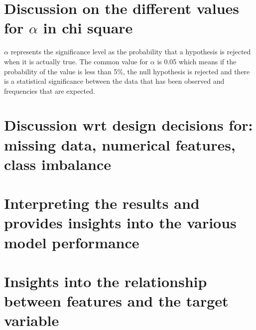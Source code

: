 \documentclass{article}
\begin{document}
\section{Discussion on the different values for $\alpha$ in chi square}

$\alpha$ represents the significance level as the probability that a hypothesis is rejected when it is actually true. The common value for $\alpha$ is 0.05 which means if the probability of the value is less than 5\%, the null hypothesis is rejected and there is a statistical significance between the data that has been observed and frequencies that are expected.



\section{Discussion wrt design decisions for: missing data, numerical features, class imbalance}
\section{Interpreting the results and provides insights into the various model performance}
\section{Insights into the relationship between features and the target variable}
\end{document}
